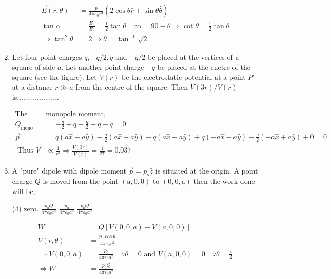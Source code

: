 \begin{enumerate}[label=\color{ocre}\textbf{\arabic*.}]
\begin{answer}
	
	\begin{align*}
	\vec{E}(r, \theta)&=\frac{p}{4 \pi \varepsilon_{0} r^{3}}(2 \cos \theta \hat{r}+\sin \theta \hat{\theta}) \\
	\tan \alpha&=\frac{E_{\theta}}{E_{r}}=\frac{1}{2} \tan \theta \quad \because \alpha=90-\theta \Rightarrow \cot \theta=\frac{1}{2} \tan \theta \\
	\Rightarrow \tan ^{2} \theta&=2 \Rightarrow \theta=\tan ^{-1} \sqrt{2}
	\end{align*}
	
\end{answer}
\item Let four point charges $q,-q / 2, q$ and $-q / 2$ be placed at the vertices of a square of
side $a$. Let another point charge $-q$ be placed at the cnetre of the square (see the figure).
Let $V(r)$ be the electrostatic potential at a point $P$ at a distance $r \gg a$ from the centre of
the square. Then $V(3 r) / V(r)$ is.....................
\begin{answer} 
	\begin{align*}
	\text{The }&\text{monopole moment,}\\
	Q_{\text {mono }}&=-\frac{q}{2}+q-\frac{q}{2}+q-q=0\\
	\vec{p}&=q(a \hat{x}+a \hat{y})-\frac{q}{2}(a \hat{x}+a \hat{y})-q(a \hat{x}-a \hat{y})+q(-a \hat{x}-a \hat{y})-\frac{q}{2}(-a \hat{x}+a \hat{y})+0=0 \\
	\text { Thus } V &\propto \frac{1}{r^{3}} \Rightarrow \frac{V(3 r)}{V(r)}=\frac{1}{27}=0.037
	\end{align*}
	
\end{answer}
\item A "pure" dipole with dipole moment $\vec{p}=p_{o} \hat{z}$ is situated at the origin. A point charge $Q$ is
moved from the point $(\mathrm{a}, 0,0)$ to $(0,0, \mathrm{a})$ then the work done will be,
\begin{tasks}(4)
	\task[\textbf{a.}]  zero. 
	\task[\textbf{b.}]$\frac{p_{0} Q}{4 \pi \varepsilon_{0} a^{3}}$
	\task[\textbf{c.}] $\frac{p_{0}}{4 \pi \varepsilon_{0} a^{2}}$
	\task[\textbf{d.}] $\frac{p_{0} Q}{4 \pi \varepsilon_{0} a^{2}}$
\end{tasks}
\begin{answer}
	\begin{align*}
	W&=Q[V(0,0, a)-V(a, 0,0)]\\
	V(r, \theta)&=\frac{p_{0} \cos \theta}{4 \pi \varepsilon_{0} r^{2}}\\ \Rightarrow V(0,0, a)&=\frac{p_{0}}{4 \pi \varepsilon_{0} a^{2}} \quad \because \theta=0 \text { and } V(a, 0,0)=0 \quad \because \theta=\frac{\pi}{2}\\
	\Rightarrow W&=\frac{p_{0} Q}{4 \pi \varepsilon_{0} a^{2}}
	\end{align*}
	
\end{answer}

\end{enumerate}
